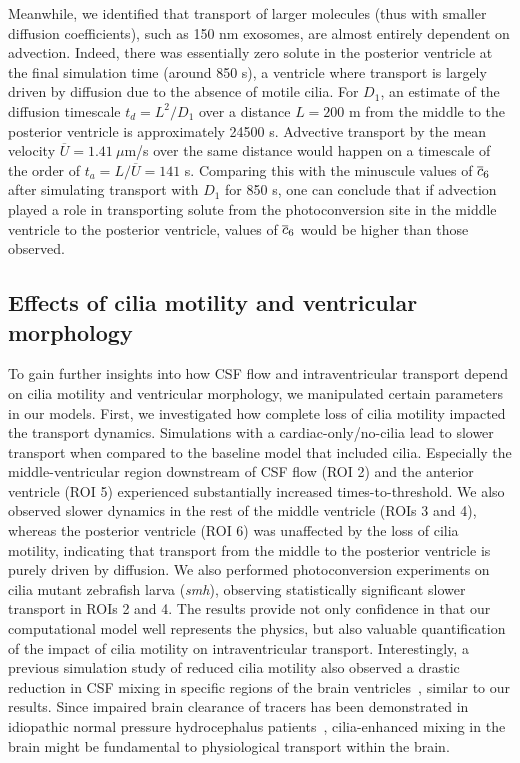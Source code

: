 \documentclass{WileyMSP-template}
\begin{document}
Meanwhile, we identified that transport of larger molecules
(thus with smaller diffusion coefficients),
such as 150 nm exosomes, are almost entirely dependent on advection.
Indeed, there was essentially zero solute in the posterior ventricle at the
final simulation time (around 850 s), a ventricle where transport is largely driven
by diffusion due to the absence of motile cilia.
For $D_1$, an estimate of the diffusion timescale $t_d=L^2/D_1$ over a distance
$L=200$ \textmu m from the middle to the posterior ventricle is approximately 24500 s.
Advective transport by the mean velocity $\overline{U}=1.41 \ \mu$m/s over the same
distance would happen on a timescale of the order of $t_a=L/\overline{U}=141$ s.
Comparing this with the minuscule values of $\overline{c}_6$ after simulating transport
with $D_1$ for 850 s, one can conclude that if advection
played a role in transporting solute from the photoconversion site in the middle ventricle
to the posterior ventricle, values of $\overline{c}_6$ would be higher than those observed.

\subsection{Effects of cilia motility and ventricular morphology}
To gain further insights into how CSF flow and intraventricular transport depend on cilia
motility and ventricular morphology, we manipulated certain
parameters in our models. First, we investigated how complete loss of cilia motility
impacted the transport dynamics. Simulations with a cardiac-only/no-cilia lead to
slower transport when compared to the baseline model that included cilia. Especially
the middle-ventricular region downstream of CSF flow (ROI 2) and the anterior ventricle (ROI 5)
experienced substantially increased times-to-threshold. We also observed
slower dynamics in the rest of the middle ventricle (ROIs 3 and 4), whereas the
posterior ventricle (ROI 6) was unaffected by the loss
of cilia motility, indicating that transport from the middle to the posterior ventricle is
purely driven by diffusion. We also performed photoconversion experiments on cilia mutant
zebrafish larva (\emph{smh}), observing statistically significant slower transport in 
ROIs 2 and 4. The results provide not only confidence in that our computational model
well represents the physics, but also valuable quantification of the impact of cilia motility
on intraventricular transport. Interestingly, a previous simulation study of reduced cilia motility
also observed a drastic reduction in CSF mixing in specific regions of the brain
ventricles~\cite{Yoshida2022EffectVentricles}, similar to our results. Since impaired brain 
clearance of tracers has been demonstrated in idiopathic normal pressure hydrocephalus
patients~\cite{Eide2020MagneticHydrocephalus}, cilia-enhanced mixing in the brain might be
fundamental to physiological transport within the brain.
\end{document}
